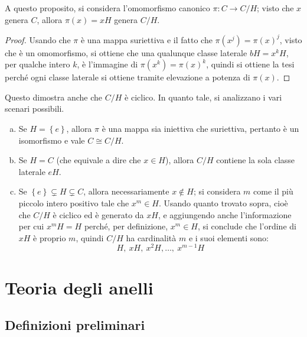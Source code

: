 \documentclass[11pt, a4paper]{scrartcl}
\theoremstyle{definition}
\numberwithin{esempio}{section}
\theoremstyle{definition}
\numberwithin{obs}{section}
\numberwithin{nota}{section}
\numberwithin{equation}{subsection}
\begin{document}
A questo proposito, si considera l'omomorfismo canonico $\pi : C\to C / H$; visto che $x$ genera $C$, allora $\pi(x) = xH$ genera $C /H $.
\begin{proof}
	Usando che $\pi$ \`e una mappa suriettiva e il fatto che $\pi(x^j)=\pi(x) ^j$, visto che \`e un omomorfismo, si ottiene che una qualunque classe laterale $bH = x^k H$, per qualche intero $k$, \`e l'immagine di $\pi(x^k) = \pi(x)^k$, quindi si ottiene la tesi perch\'e ogni classe laterale si ottiene tramite elevazione a potenza di $\pi(x)$.
\end{proof}
Questo dimostra anche che $C / H$ \`e ciclico.
In quanto tale, si analizzano i vari scenari possibili.
\begin{enumerate}[(a).]
	\item Se $H = \left\{ e \right\} $, allora $\pi$ \`e una mappa sia iniettiva che suriettiva, pertanto \`e un isomorfismo e vale $C \cong C / H$.
	\item Se $H = C$ (che equivale a dire che $x \in H$), allora $C / H$ contiene la sola classe laterale $eH$.
	\item Se $\left\{ e \right\} \subsetneq H \subsetneq C$, allora necessariamente $x \not \in H$; si considera $m$ come il pi\`u piccolo intero positivo tale che $x^m \in H$.
		Usando quanto trovato sopra, cio\`e che $C/H$ \`e ciclico ed \`e generato da $xH$, e aggiungendo anche l'informazione per cui $x^mH = H$ perch\'e, per definizione, $x^m \in H$, si conclude che l'ordine di $xH$ \`e proprio $m$, quindi $C / H$ ha cardinalit\`a $m$ e i suoi elementi sono:
		\[
		H,\ xH,\ x^2 H, \ldots , \ x^{m-1} H
		\] 
\end{enumerate}
\newpage
\section{Teoria degli anelli}
\subsection{Definizioni preliminari}
\end{document}
